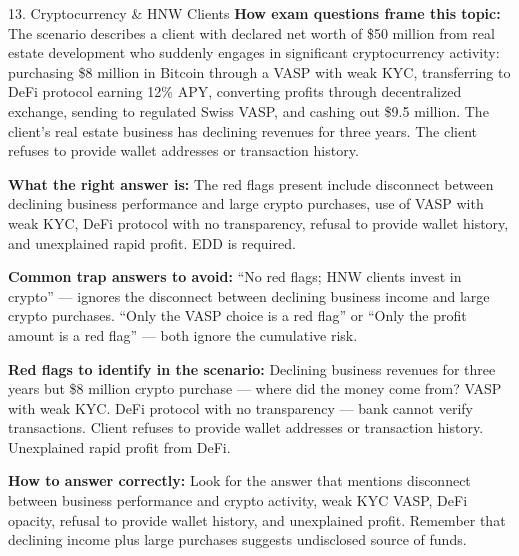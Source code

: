 \documentclass[11pt,a4paper]{beamer}
\begin{document}
	\begin{frame}{13. Cryptocurrency \& HNW Clients}
		\tiny
		\noindent\textbf{How exam questions frame this topic:} The scenario describes a client with declared net worth of \$50 million from real estate development who suddenly engages in significant cryptocurrency activity: purchasing \$8 million in Bitcoin through a VASP with weak KYC, transferring to DeFi protocol earning 12\% APY, converting profits through decentralized exchange, sending to regulated Swiss VASP, and cashing out \$9.5 million. The client's real estate business has declining revenues for three years. The client refuses to provide wallet addresses or transaction history.
		
		\vspace{0.1cm}
		\noindent\textbf{What the right answer is:} The red flags present include disconnect between declining business performance and large crypto purchases, use of VASP with weak KYC, DeFi protocol with no transparency, refusal to provide wallet history, and unexplained rapid profit. EDD is required.
		
		\vspace{0.1cm}
		\noindent\textbf{Common trap answers to avoid:} “No red flags; HNW clients invest in crypto” — ignores the disconnect between declining business income and large crypto purchases. “Only the VASP choice is a red flag” or “Only the profit amount is a red flag” — both ignore the cumulative risk.
		
		\vspace{0.1cm}
		\noindent\textbf{Red flags to identify in the scenario:} Declining business revenues for three years but \$8 million crypto purchase — where did the money come from? VASP with weak KYC. DeFi protocol with no transparency — bank cannot verify transactions. Client refuses to provide wallet addresses or transaction history. Unexplained rapid profit from DeFi.
		
		\vspace{0.1cm}
		\noindent\textbf{How to answer correctly:} Look for the answer that mentions disconnect between business performance and crypto activity, weak KYC VASP, DeFi opacity, refusal to provide wallet history, and unexplained profit. Remember that declining income plus large purchases suggests undisclosed source of funds.
	\end{frame}
	
\end{document}
